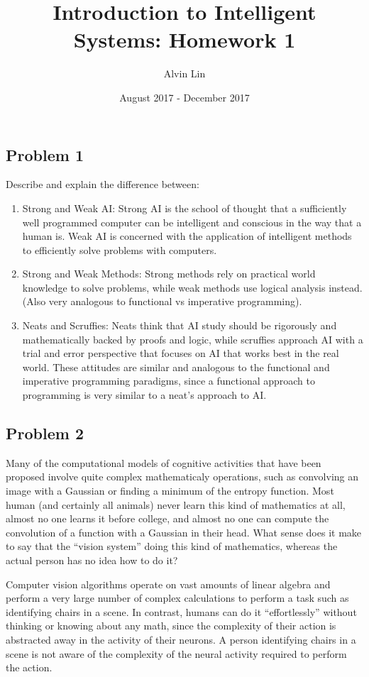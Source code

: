 \documentclass{math}
\title{Introduction to Intelligent Systems: Homework 1}
\author{Alvin Lin}
\date{August 2017 - December 2017}
\begin{document}
\maketitle

\subsection*{Problem 1}
Describe and explain the difference between:
\begin{enumerate}
  \item Strong and Weak AI: Strong AI is the school of thought that a
  sufficiently well programmed computer can be intelligent and conscious in the
  way that a human is. Weak AI is concerned with the application of
  intelligent methods to efficiently solve problems with computers.
  \item Strong and Weak Methods: Strong methods rely on practical world
  knowledge to solve problems, while weak methods use logical analysis instead.
  (Also very analogous to functional vs imperative programming).
  \item Neats and Scruffies: Neats think that AI study should be rigorously
  and mathematically backed by proofs and logic, while scruffies approach AI
  with a trial and error perspective that focuses on AI that works best in the
  real world. These attitudes are similar and analogous to the functional and
  imperative programming paradigms, since a functional approach to programming
  is very similar to a neat's approach to AI.
\end{enumerate}

\subsection*{Problem 2}
Many of the computational models of cognitive activities that have been
proposed involve quite complex mathematicaly operations, such as convolving an
image with a Gaussian or finding a minimum of the entropy function. Most human
(and certainly all animals) never learn this kind of mathematics at all, almost
no one learns it before college, and almost no one can compute the convolution
of a function with a Gaussian in their head. What sense does it make to say that
the ``vision system'' doing this kind of mathematics, whereas the actual person
has no idea how to do it?
\par Computer vision algorithms operate on vast amounts of linear algebra and
perform a very large number of complex calculations to perform a task such as
identifying chairs in a scene. In contrast, humans can do it ``effortlessly''
without thinking or knowing about any math, since the complexity of their
action is abstracted away in the activity of their neurons. A person identifying
chairs in a scene is not aware of the complexity of the neural activity
required to perform the action.
\end{document}
